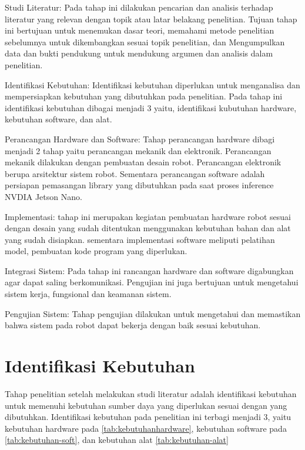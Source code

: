 \begin{packed_enum}
	\item Studi Literatur: Pada tahap ini dilakukan pencarian dan analisis terhadap literatur yang relevan dengan topik atau latar belakang penelitian. Tujuan tahap ini bertujuan untuk menemukan dasar teori, memahami metode penelitian sebelumnya untuk dikembangkan sesuai topik penelitian, dan Mengumpulkan data dan bukti pendukung untuk mendukung argumen dan analisis dalam penelitian.
	\item Identifikasi Kebutuhan: Identifikasi kebutuhan diperlukan untuk menganalisa dan mempersiapkan kebutuhan yang dibutuhkan pada penelitian. Pada tahap ini identifikasi kebutuhan dibagai menjadi 3 yaitu, identifikasi kubutuhan hardware, kebutuhan software, dan alat.
	\item Perancangan Hardware dan Software: Tahap perancangan hardware dibagi menjadi 2 tahap yaitu perancangan mekanik dan elektronik. Perancangan mekanik dilakukan dengan pembuatan desain robot. Perancangan elektronik berupa arsitektur sistem robot. Sementara perancangan software adalah persiapan pemasangan library yang dibutuhkan pada saat proses inference NVDIA Jetson Nano.
	\item Implementasi: tahap ini merupakan kegiatan pembuatan hardware robot sesuai dengan desain yang sudah ditentukan menggunakan kebutuhan bahan dan alat yang sudah disiapkan. sementara implementasi software meliputi pelatihan model, pembuatan kode program yang diperlukan.
	\item Integrasi Sistem: Pada tahap ini rancangan hardware dan software digabungkan agar dapat saling berkomunikasi. Pengujian ini juga bertujuan untuk mengetahui sistem kerja, fungsional dan keamanan sistem.
	\item Pengujian Sistem: Tahap pengujian dilakukan untuk mengetahui dan memastikan bahwa sistem pada robot dapat bekerja dengan baik sesuai kebutuhan. 
\end{packed_enum}

\section{Identifikasi Kebutuhan}
Tahap penelitian setelah melakukan studi literatur adalah identifikasi kebutuhan untuk memenuhi kebutuhan sumber daya yang diperlukan sesuai dengan yang dibutuhkan. Identifikasi kebutuhan pada penelitian ini terbagi menjadi 3, yaitu kebutuhan hardware pada \cref{tab:kebutuhanhardware}, kebutuhan software pada \cref{tab:kebutuhan-soft}, dan kebutuhan alat \cref{tab:kebutuhan-alat}

